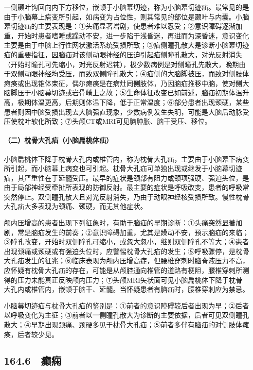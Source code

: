 一侧颞叶钩回向内下方移位，嵌顿于小脑幕切迹，称为小脑幕切迹疝。最常见的是由于小脑幕上病变所引起，如病变为占位性，则其常见的部位是颞叶与内囊。小脑幕切迹疝的主要表现是：①头痛显著增剧，使患者难以忍受；②意识障碍逐渐加重，开始时患者嗜睡或躁动不安，进一步陷于浅昏迷，再进而为深昏迷，意识变化主要是由于中脑上行性网状激活系统受损所致；③疝侧瞳孔散大是诊断小脑幕切迹疝的重要指征，因脑疝对该侧动眼神经的压迫引起疝侧瞳孔散大，对光反射消失（开始时瞳孔可先缩小，对光反射迟钝），极少数病例是对侧瞳孔先散大，晚期由于双侧动眼神经均受压，而致双侧瞳孔散大；④疝侧的大脑脚被压，而致对侧肢体瘫痪或出现锥体束征，偶尔瘫痪是在病灶同侧肢体，乃因脑疝推移中脑，使对侧大脑脚压于小脑幕切迹或岩骨嵴上之故；⑤生命体征改变已如前述，脑疝初期体温升高，极期体温更高，后期则体温下降，低于正常温度；⑥部分患者出现颈硬，某些患者则因中脑受损出现去大脑强直现象，少数病例发生失明，可能是大脑后动脉受压使枕叶软化所致；⑦头颅CT或MRI可见脑肿胀、脑干受压、移位。

\paragraph{（二）枕骨大孔疝（小脑扁桃体疝）}

小脑扁桃体下降于枕骨大孔内或椎管内，称为枕骨大孔疝，主要由于小脑幕下病变所引起，而小脑幕上病变也可引起。枕骨大孔疝可单独出现或继发于小脑幕切迹疝，其严重性在于延髓受压。最早的症状是颈部有阻力或颈项强硬、强迫头位，是由于局部神经受牵扯所表现的防御反射。最主要的症状是呼吸改变，患者的呼吸常突然停止。双侧瞳孔散大且对光反射消失，乃由于动眼神经核受损所致。慢性枕骨大孔疝大多表现为颈痛、颈硬，而无其他症状。

颅内压增高的患者出现下列征象时，有助于脑疝的早期诊断：①头痛突然显著加剧，常是脑疝发生的前奏；②意识障碍加重，尤其是躁动不安，预示脑疝的来临；③瞳孔改变，开始时双侧瞳孔可缩小，或忽大忽小，继则双侧瞳孔不等大；④患者出现颈痛或颈硬或有强迫头位时，应警惕枕骨大孔疝的发生；⑤呼吸骤停，是枕骨大孔疝发生的征兆；⑥临床表现为颅内压增高症，但腰椎穿刺时脑脊液压力不高，应怀疑有枕骨大孔疝的存在，可能是从颅腔通向椎管的道路有梗阻，腰椎穿刺所测得的压力未能真正反映颅内压力；⑦头颅MRI矢状面可见小脑扁桃体下降于枕骨大孔内或椎管内，嵌顿于脑干、延髓。当怀疑患者有脑疝时，腰椎穿刺应为禁忌。

小脑幕切迹疝与枕骨大孔疝的鉴别是：①前者的意识障碍较后者出现为早；②后者以呼吸变化为主征；③前者以一侧瞳孔散大为诊断的主要依据，后者可见双侧瞳孔散大；④早期出现颈痛、颈硬多见于枕骨大孔疝；⑤前者多伴有脑疝的对侧肢体瘫痪，后者较少见。

\protect\hypertarget{text00380.html}{}{}

\subsection{164.6　癫痫}

